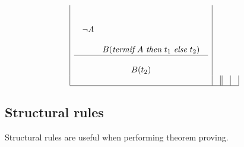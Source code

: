 \[\begin{array}{|c|c||c|c|}
\begin{array}{cc}
\begin{array}{c}
\neg A
\end{array}
\begin{array}{c}
\\ \\ \\ \\
B(\mbox{{\em termif}} \ A \ \mbox{{\em then}} \ t_1 \ \mbox{{\em else}} \ t_2)
\end{array}
\\
\hline\\
\begin{array}{c}
B(t_2)
\end{array}
\end{array}
\\ 
& & & \\ \hline 
\end{array}
\]
\renewcommand{\arraystretch}{1}


\subsection{Structural rules}

Structural rules are useful when performing theorem proving.